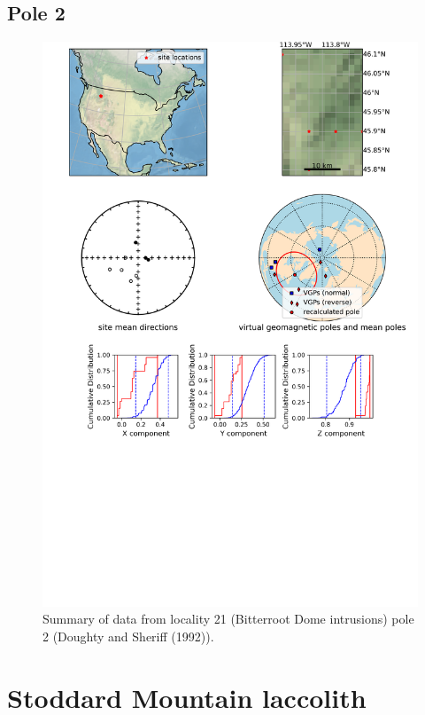 \documentclass{article}
\begin{document}
\subsection{Pole 2}


\begin{figure}[H]
\centering
\includegraphics[width=5 in]{./21/2/pole_summary.png}
\caption{Summary of data from locality 21 (Bitterroot Dome intrusions) pole 2 (Doughty and Sheriff (1992)).}
\end{figure}

\section{Stoddard Mountain laccolith}
\end{document}
